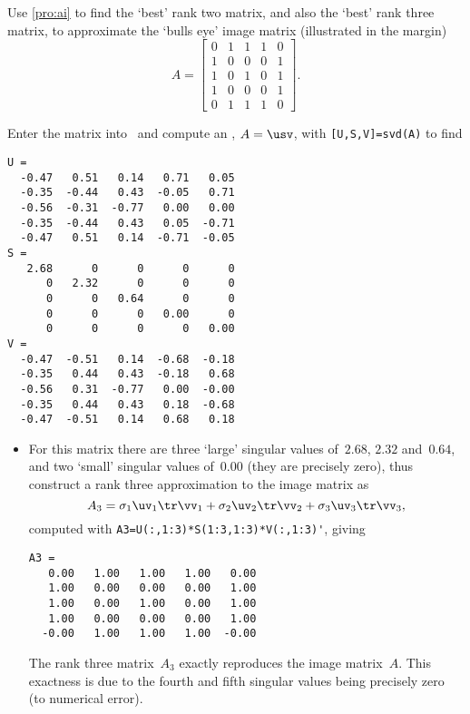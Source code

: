 \begin{example} \label{eg:bullseyemat}
Use \autoref{pro:ai} to find the `best' rank two matrix, and also the `best' rank three matrix, to approximate the `bulls eye' image matrix (illustrated in the margin)
\marginpar{}
\begin{equation*}
A=\begin{bmatrix} 0&1&1&1&0
\\1&0&0&0&1
\\1&0&1&0&1
\\1&0&0&0&1
\\0&1&1&1&0 \end{bmatrix}.
\end{equation*}
\begin{solution} 
Enter the matrix into \script\ and compute an \svd, \(A=\usv\), with \verb|[U,S,V]=svd(A)| to find \twodp
\begin{verbatim}
U =
  -0.47   0.51   0.14   0.71   0.05
  -0.35  -0.44   0.43  -0.05   0.71
  -0.56  -0.31  -0.77   0.00   0.00
  -0.35  -0.44   0.43   0.05  -0.71
  -0.47   0.51   0.14  -0.71  -0.05
S =
   2.68      0      0      0      0
      0   2.32      0      0      0
      0      0   0.64      0      0
      0      0      0   0.00      0
      0      0      0      0   0.00
V =
  -0.47  -0.51   0.14  -0.68  -0.18
  -0.35   0.44   0.43  -0.18   0.68
  -0.56   0.31  -0.77   0.00  -0.00
  -0.35   0.44   0.43   0.18  -0.68
  -0.47  -0.51   0.14   0.68   0.18
\end{verbatim}
\setbox\ajrqrbox\hbox{}%
\marginpar{\usebox{\ajrqrbox\\[2ex]}}%
\begin{itemize}
\item For this matrix there are three `large' singular values of~\(2.68\), \(2.32\) and~\(0.64\), and two `small' singular values of~\(0.00\) (they are precisely zero), thus construct a rank three approximation to the image matrix as
\begin{equation*}
A_3=\sigma_1\uv_1\tr\vv_1+\sigma_2\uv_2\tr\vv_2+\sigma_3\uv_3\tr\vv_3,
\end{equation*}
computed with \verb|A3=U(:,1:3)*S(1:3,1:3)*V(:,1:3)'|, giving \twodp
\begin{verbatim}
A3 =
   0.00   1.00   1.00   1.00   0.00
   1.00   0.00   0.00   0.00   1.00
   1.00   0.00   1.00   0.00   1.00
   1.00   0.00   0.00   0.00   1.00
  -0.00   1.00   1.00   1.00  -0.00
\end{verbatim}
The rank three matrix~\(A_3\) exactly reproduces the image matrix~\(A\). 
This exactness is due to the  fourth and fifth singular values being precisely zero (to numerical error).


\end{itemize}
\end{solution}
\end{example}
